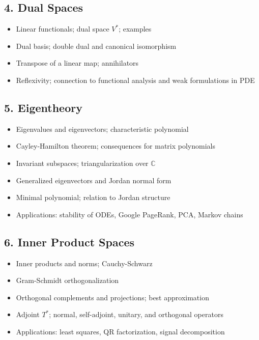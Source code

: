 \subsection{4. Dual Spaces}
\begin{itemize}
\item Linear functionals; dual space $V^*$; examples
\item Dual basis; double dual and canonical isomorphism
\item Transpose of a linear map; annihilators
\item Reflexivity; connection to functional analysis and weak formulations in PDE
\end{itemize}

\subsection{5. Eigentheory}
\begin{itemize}
\item Eigenvalues and eigenvectors; characteristic polynomial
\item Cayley-Hamilton theorem; consequences for matrix polynomials
\item Invariant subspaces; triangularization over $\mathbb{C}$
\item Generalized eigenvectors and Jordan normal form
\item Minimal polynomial; relation to Jordan structure
\item Applications: stability of ODEs, Google PageRank, PCA, Markov chains
\end{itemize}

\subsection{6. Inner Product Spaces}
\begin{itemize}
\item Inner products and norms; Cauchy-Schwarz
\item Gram-Schmidt orthogonalization
\item Orthogonal complements and projections; best approximation
\item Adjoint $T^*$; normal, self-adjoint, unitary, and orthogonal operators
\item Applications: least squares, QR factorization, signal decomposition
\end{itemize}


